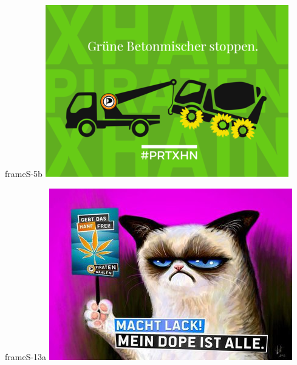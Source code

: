 \documentclass[a4paper,10pt]{article}
\begin{document}
\begin{staticcontents*}{frameS-5b}
\hspace*{-4.5cm}
\vspace*{2cm}
\includegraphics[width=\paperwidth]{images/blog/small/gruenebetonmischer.png}
\vspace*{1cm}
\end{staticcontents*}



\begin{staticcontents*}{frameS-13a}
\includegraphics[viewport = {0cm 0cm 21cm 16cm}, clip]{images/blog/small/machtlack.jpg}
\end{staticcontents*}



\end{document}
